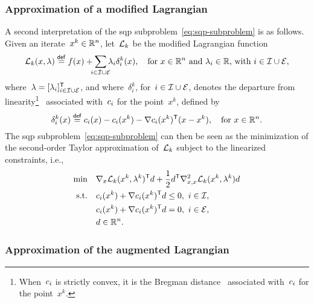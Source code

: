 \subsubsection{Approximation of a modified Lagrangian}

A second interpretation of the \gls{sqp} subproblem~\cref{eq:sqp-subproblem} is as follows.
Given an iterate~$x^k \in \mathbb{R}^n$, let~$\lag[k]$ be the modified Lagrangian function
\begin{equation*}
    \lag[k](x, \lambda) \eqdef \obj(x) + \sum_{\mathclap{i \in \iub \cup \ieq}} \lambda_i \delta_i^k(x), \quad \text{for~$x \in \R^n$ and~$\lambda_i \in \R$, with~$i \in \iub \cup \ieq$},
\end{equation*}
where~$\lambda = [\lambda_i]_{i \in \mathcal{I} \cup \mathcal{E}}^{\mathsf{T}}$, and where~$\delta_i^k$, for~$i \in \mathcal{I} \cup \mathcal{E}$, denotes the departure from linearity\footnote{When~$c_{i}$ is strictly convex, it is the Bregman distance~\cite{Bregman_1967} associated with~$c_{i}$ for the point~$x^k$.}~\cite{Robinson_1972,Hoek_1982} associated with~$c_{i}$ for the point~$x^k$, defined by
\begin{equation*}
    \delta_i^k(x) \mathrel{\stackrel{\mathsf{def}}{=}} c_{i}(x) - c_{i}(x^k) - \nabla c_{i}(x^k)^{\mathsf{T}} (x - x^k), \quad \text{for~$x \in \mathbb{R}^n$.}
\end{equation*}
The \gls{sqp} subproblem~\cref{eq:sqp-subproblem} can then be seen as the minimization of the second-order Taylor approximation of~$\lag[k]$ subject to the linearized constraints, i.e.,
\begin{align}
    \min        & \quad \nabla_x \lag[k](x^k, \lambda^k)^{\T} d + \frac{1}{2} d^{\T} \nabla_{x, x}^2 \lag[k](x^k, \lambda^k) d\\
    \text{s.t.} & \quad \con{i}(x^k) + \nabla \con{i}(x^k)^{\T} d \le 0, ~ i \in \iub,\\
                & \quad \con{i}(x^k) + \nabla \con{i}(x^k)^{\T} d = 0, ~ i \in \ieq,\\
                & \quad d \in \R^n.
\end{align}

\subsubsection{Approximation of the augmented Lagrangian}

